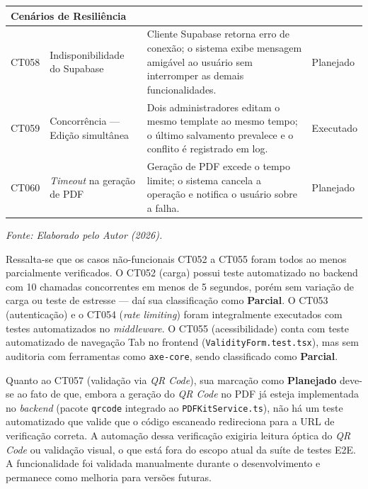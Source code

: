 \begin{longtable}{p{1.2cm} p{4.2cm} p{7.5cm} p{2.6cm}}
\midrule
\multicolumn{3}{l}{\textbf{Cenários de Resiliência}} \\
\midrule

CT058 & Indisponibilidade do Supabase & Cliente Supabase retorna erro de conexão; o sistema exibe mensagem amigável ao usuário sem interromper as demais funcionalidades. & Planejado \\
CT059 & Concorrência — Edição simultânea & Dois administradores editam o mesmo template ao mesmo tempo; o último salvamento prevalece e o conflito é registrado em log. & Executado \\
CT060 & \textit{Timeout} na geração de PDF & Geração de PDF excede o tempo limite; o sistema cancela a operação e notifica o usuário sobre a falha. & Planejado \\

\bottomrule
\end{longtable}
\par\vspace{4pt}
\endgroup
\noindent\raggedright\small\textit{Fonte: Elaborado pelo Autor (2026).}
\normalsize
\renewcommand{\arraystretch}{1.0}

Ressalta-se que os casos não-funcionais CT052 a CT055 foram todos ao menos parcialmente verificados. O CT052 (carga) possui teste automatizado no backend com 10 chamadas concorrentes em menos de 5 segundos, porém sem variação de carga ou teste de estresse --- daí sua classificação como \textbf{Parcial}. O CT053 (autenticação) e o CT054 (\textit{rate limiting}) foram integralmente executados com testes automatizados no \textit{middleware}. O CT055 (acessibilidade) conta com teste automatizado de navegação Tab no frontend (\texttt{ValidityForm.test.tsx}), mas sem auditoria com ferramentas como \texttt{axe-core}, sendo classificado como \textbf{Parcial}.

Quanto ao CT057 (validação via \textit{QR Code}), sua marcação como \textbf{Planejado} deve-se ao fato de que, embora a geração do \textit{QR Code} no PDF já esteja implementada no \textit{backend} (pacote \texttt{qrcode} integrado ao \texttt{PDFKitService.ts}), não há um teste automatizado que valide que o código escaneado redireciona para a URL de verificação correta. A automação dessa verificação exigiria leitura óptica do \textit{QR Code} ou validação visual, o que está fora do escopo atual da suíte de testes E2E. A funcionalidade foi validada manualmente durante o desenvolvimento e permanece como melhoria para versões futuras.
